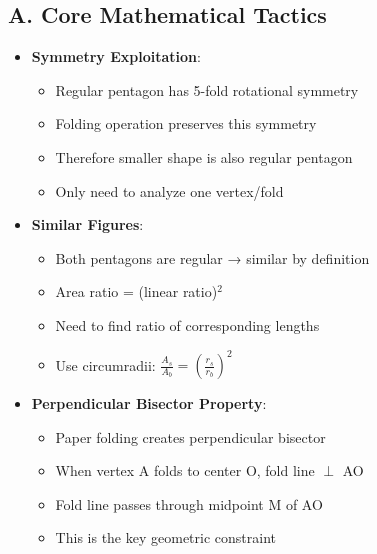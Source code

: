 \documentclass[12pt]{article}
\begin{document}
\begin{tacticalbox}
\subsection*{A. Core Mathematical Tactics}
\begin{itemize}[leftmargin=*]
    \item \textbf{Symmetry Exploitation}: 
    \begin{itemize}
        \item Regular pentagon has 5-fold rotational symmetry
        \item Folding operation preserves this symmetry
        \item Therefore smaller shape is also regular pentagon
        \item Only need to analyze one vertex/fold
    \end{itemize}
    \item \textbf{Similar Figures}: 
    \begin{itemize}
        \item Both pentagons are regular → similar by definition
        \item Area ratio = (linear ratio)$^2$
        \item Need to find ratio of corresponding lengths
        \item Use circumradii: $\frac{A_s}{A_b} = \left(\frac{r_s}{r_b}\right)^2$
    \end{itemize}
    \item \textbf{Perpendicular Bisector Property}: 
    \begin{itemize}
        \item Paper folding creates perpendicular bisector
        \item When vertex A folds to center O, fold line $\perp$ AO
        \item Fold line passes through midpoint M of AO
        \item This is the key geometric constraint
    \end{itemize}
\end{itemize}


\end{tacticalbox}
\end{document}
